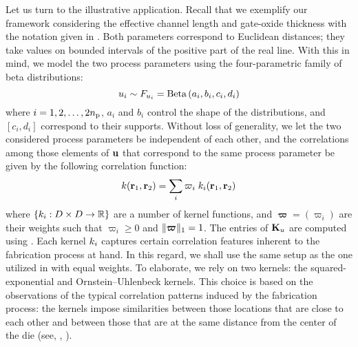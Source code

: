 Let us turn to the illustrative application.
Recall that we exemplify our framework considering the effective channel length and gate-oxide thickness with the notation given in .
Both parameters correspond to Euclidean distances; they take values on bounded intervals of the positive part of the real line.
With this in mind, we model the two process parameters using the four-parametric family of beta distributions:
\begin{equation*}
  \u_i \sim \distribution_{\u_i} = \betaDistribution{a_i, b_i, c_i, d_i}
\end{equation*}
where $i = 1, 2, \dots, 2 \nprocs$, $a_i$ and $b_i$ control the shape of the distributions, and $[ c_i, d_i ]$ correspond to their supports.
Without loss of generality, we let the two considered process parameters be independent of each other, and the correlations among those elements of $\vu$ that correspond to the same process parameter be given by the following correlation function:
\begin{equation} \elab{correlation-function}
  \fCorr(\vr_1, \vr_2) = \sum_i \varpi_i \; \fCorr_i(\vr_1, \vr_2)
\end{equation}
where $\{ \fCorr_i: \domain \times \domain \to \real \}$ are a number of kernel functions, and $\bm{\varpi} = (\varpi_i)$ are their weights such that $\varpi_i \geq 0$ and $\norm[1]{\bm{\varpi}} = 1$.
The entries of $\mCorr_\u$ are computed using .
Each kernel $\fCorr_i$ captures certain correlation features inherent to the fabrication process at hand.
In this regard, we shall use the same setup as the one utilized in \cite{ukhov2014} with equal weights.
To elaborate, we rely on two kernels: the squared-exponential and Ornstein--Uhlenbeck kernels.
This choice is based on the observations of the typical correlation patterns induced by the fabrication process: the kernels impose similarities between those locations that are close to each other and between those that are at the same distance from the center of the die (see, \eg, \cite{friedberg2005}).
